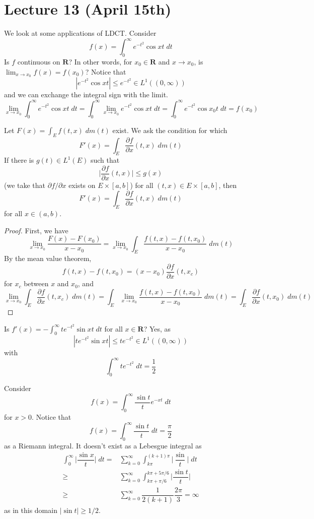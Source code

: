 \section{Lecture 13 (April 15th)}
\begin{ex}
We look at some applications of LDCT. Consider
\[f(x)=\int ^{\infty }_{0}e^{-t^2}\cos xt\;dt\]
Is $f$ continuous on ${\bm R}$? In other words, for $x_0\in {\bm R}$ and $x\rightarrow x_0$, is $\lim _{x\rightarrow x_0}f(x)=f(x_0)$? Notice that
\[|e^{-t^2}\cos xt|\leq e^{-t^2}\in L^{1}((0,\infty ))\]
and we can exchange the integral sign with the limit.
\[\lim _{x\rightarrow x_0}\int ^{\infty }_{0}e^{-t^2}\cos xt\;dt=\int ^{\infty }_{0}\lim _{x\rightarrow x_0}e^{-t^2}\cos xt\;dt=\int ^{\infty }_{0}e^{-t^2}\cos x_0t\;dt=f(x_0)\]
\end{ex}
\vspace{2ex}
\begin{thm}
Let $F(x)=\int _{E}f(t,x)\;dm(t)$ exist. We ask the condition for which
\[F'(x)=\int _{E}\dfrac{\partial f}{\partial x}(t,x)\;dm(t) \]
If there is $g(t)\in L^{1}(E)$ such that 
\[\Big|\dfrac{\partial f}{\partial x}(t,x) \Big|\leq g(x)\]
(we take that $\partial f/\partial x$ exists on $E\times [a,b]$) for all $(t,x)\in E\times [a,b]$, then
\[F'(x)=\int _{E}\dfrac{\partial f}{\partial x}(t,x)\;d m(t) \]
for all $x\in (a,b)$. 
\end{thm}
\vspace{2ex}
\begin{proof}
First, we have
\[\lim _{x\rightarrow x_0}\dfrac{F(x)-F(x_0)}{x-x_0}=\lim _{x\rightarrow x_0}\int _{E}\dfrac{f(t,x)-f(t,x_0)}{x-x_0}\;d m(t)\]
By the mean value theorem,
\[f(t,x)-f(t,x_0)=(x-x_0)\dfrac{\partial f}{\partial x}(t,x_c) \]
for $x_{c}$ between $x$ and $x_0$, and
\[\lim _{x\rightarrow x_0}\int _{E}\dfrac{\partial f}{\partial x}(t,x_c)\;d m(t)=\int _{E}\lim _{x\rightarrow x_0}\dfrac{f(t,x)-f(t,x_0)}{x-x_0}\;d m(t)=\int _{E}\dfrac{\partial f}{\partial x}(t,x_0)\;dm (t)  \]
\end{proof}
\vspace{2ex}
\begin{ex}
Is $f'(x)=-\int ^{\infty }_{0}te^{-t^2}\sin xt\;dt$ for all $x\in {\bm R}$? Yes, as
\[|te^{-t^2}\sin xt|\leq te^{-t^2}\in L^{1}((0,\infty ))\]
with 
\[\int ^{\infty }_{0}te^{-t^2}\;dt=\dfrac{1}{2}\]
\end{ex}
\vspace{2ex}
\begin{ex}
Consider
\[f(x)=\int ^{\infty }_{0}\dfrac{\sin t}{t}e^{-xt}\;dt\]
for $x>0$. Notice that
\[f(x)=\int^{\infty }_{0}\dfrac{\sin t}{t}\;dt=\dfrac{\pi }{2} \]
as a Riemann integral. It doesn't exist as a Lebesgue integral as
\begin{align*}
\int ^{\infty }_{0}\Big|\dfrac{\sin x}{t}\Big|\;dt=&\sum _{k=0}^{\infty }\int ^{(k+1)\pi }_{k\pi }\Big|\dfrac{\sin }{t}\Big|\;dt\\
\geq& \sum ^{\infty }_{k=0}\int ^{k\pi +5\pi /6}_{k\pi +\pi /6}\Big|\dfrac{\sin t}{t}\Big|\\
\geq& \sum ^{\infty }_{k=0}\dfrac{1}{2(k+1)}\dfrac{2\pi }{3}=\infty 
\end{align*}
as in this domain $|\sin t|\geq 1/2$. 
\end{ex}
